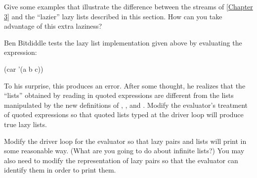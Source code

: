 \begin{exercise}
	\label{Exercise 4.32}
	Give some examples that illustrate the difference between the streams of \cref{Chapter 3} and the “lazier” lazy lists described in this section.
	How can you take advantage of this extra laziness?
\end{exercise}



\begin{exercise}
	\label{Exercise 4.33}
	Ben Bitdiddle tests the lazy list implementation given above by evaluating the expression:
	\begin{scheme}
	  (car '(a b c))
	\end{scheme}
	To his surprise, this produces an error.
	After some thought, he realizes that the “lists” obtained by reading in quoted expressions are different from the lists manipulated by the new definitions of , , and .
	Modify the evaluator’s treatment of quoted expressions so that quoted lists typed at the driver loop will produce true lazy lists.
\end{exercise}



\begin{exercise}
	\label{Exercise 4.34}
	Modify the driver loop for the evaluator so that lazy pairs and lists will print in some reasonable way.
	(What are you going to do about infinite lists?)
	You may also need to modify the representation of lazy pairs so that the evaluator can identify them in order to print them.
\end{exercise}
